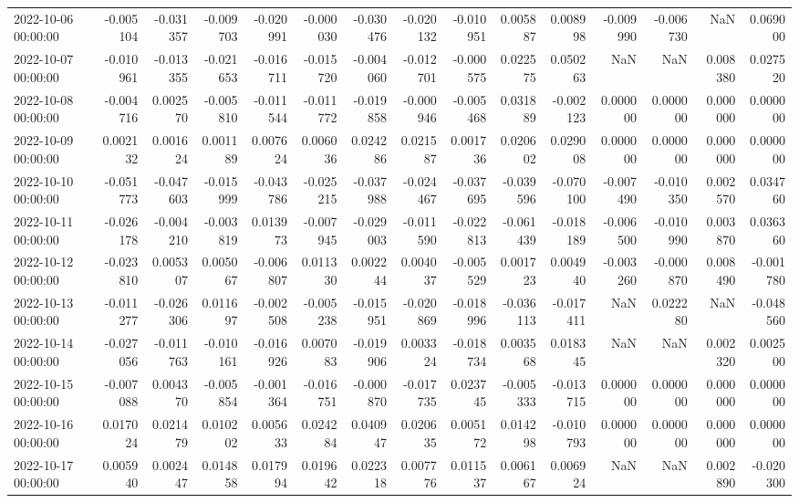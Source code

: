 \begin{tabular}{lrrrrrrrrrrrrrr}
2022-10-06 00:00:00 & -0.005104 & -0.031357 & -0.009703 & -0.020991 & -0.000030 & -0.030476 & -0.020132 & -0.010951 & 0.005887 & 0.008998 & -0.009990 & -0.006730 & NaN & 0.069000 \\
2022-10-07 00:00:00 & -0.010961 & -0.013355 & -0.021653 & -0.016711 & -0.015720 & -0.004060 & -0.012701 & -0.000575 & 0.022575 & 0.050263 & NaN & NaN & 0.008380 & 0.027520 \\
2022-10-08 00:00:00 & -0.004716 & 0.002570 & -0.005810 & -0.011544 & -0.011772 & -0.019858 & -0.000946 & -0.005468 & 0.031889 & -0.002123 & 0.000000 & 0.000000 & 0.000000 & 0.000000 \\
2022-10-09 00:00:00 & 0.002132 & 0.001624 & 0.001189 & 0.007624 & 0.006036 & 0.024286 & 0.021587 & 0.001736 & 0.020602 & 0.029008 & 0.000000 & 0.000000 & 0.000000 & 0.000000 \\
2022-10-10 00:00:00 & -0.051773 & -0.047603 & -0.015999 & -0.043786 & -0.025215 & -0.037988 & -0.024467 & -0.037695 & -0.039596 & -0.070100 & -0.007490 & -0.010350 & 0.002570 & 0.034760 \\
2022-10-11 00:00:00 & -0.026178 & -0.004210 & -0.003819 & 0.013973 & -0.007945 & -0.029003 & -0.011590 & -0.022813 & -0.061439 & -0.018189 & -0.006500 & -0.010990 & 0.003870 & 0.036360 \\
2022-10-12 00:00:00 & -0.023810 & 0.005307 & 0.005067 & -0.006807 & 0.011330 & 0.002244 & 0.004037 & -0.005529 & 0.001723 & 0.004940 & -0.003260 & -0.000870 & 0.008490 & -0.001780 \\
2022-10-13 00:00:00 & -0.011277 & -0.026306 & 0.011697 & -0.002508 & -0.005238 & -0.015951 & -0.020869 & -0.018996 & -0.036113 & -0.017411 & NaN & 0.022280 & NaN & -0.048560 \\
2022-10-14 00:00:00 & -0.027056 & -0.011763 & -0.010161 & -0.016926 & 0.007083 & -0.019906 & 0.003324 & -0.018734 & 0.003568 & 0.018345 & NaN & NaN & 0.002320 & 0.002500 \\
2022-10-15 00:00:00 & -0.007088 & 0.004370 & -0.005854 & -0.001364 & -0.016751 & -0.000870 & -0.017735 & 0.023745 & -0.005333 & -0.013715 & 0.000000 & 0.000000 & 0.000000 & 0.000000 \\
2022-10-16 00:00:00 & 0.017024 & 0.021479 & 0.010202 & 0.005633 & 0.024284 & 0.040947 & 0.020635 & 0.005172 & 0.014298 & -0.010793 & 0.000000 & 0.000000 & 0.000000 & 0.000000 \\
2022-10-17 00:00:00 & 0.005940 & 0.002447 & 0.014858 & 0.017994 & 0.019642 & 0.022318 & 0.007776 & 0.011537 & 0.006167 & 0.006924 & NaN & NaN & 0.002890 & -0.020300 \\

\end{tabular}
